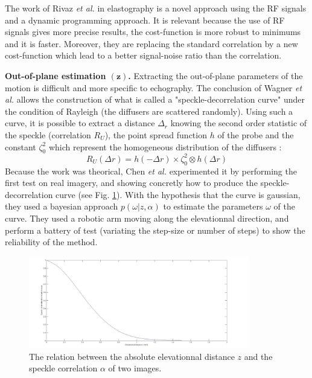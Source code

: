 \documentclass[runningheads,a4paper]{llncs}
\begin{document}
The work of Rivaz \textit{et al.} \cite{rivaz2008ultrasound} in elastography is a novel approach using the RF signals and a dynamic programming approach. It is relevant because the use of RF signals gives more precise results, the cost-function is more robust to minimums and it is faster. Moreover, they are replacing the standard correlation by a new cost-function which lead to a better signal-noise ratio than the correlation.\par
\textbf{Out-of-plane estimation $\mathbf{(z)}$.} Extracting the out-of-plane parameters of the motion is difficult and more specific to echography.
The conclusion of Wagner \textit{et al.} \cite{wagner1983statistics} allows the construction of what is called a "speckle-decorrelation curve" under the condition of Rayleigh (the diffusers are scattered randomly). Using such a curve, it is possible to extract a distance $\Delta_r$ knowing the second order statistic of the speckle (correlation $R_U$), the point spread function $h$ of the probe and the constant $\zeta_0^2$ which represent the homogeneous distribution of the diffusers :
\begin{equation}
R_U(\Delta r)=	h(-\Delta r)\times \zeta_0^2\otimes h(\Delta r)
\end{equation}
Because the work was theorical, Chen \textit{et al.} \cite{chen1997determination} experimented it by performing the first test on real imagery, and showing concretly how to produce the speckle-decorrelation curve (see Fig. \ref{fig:speckledecorrelation}).
With the hypothesis that the curve is gaussian, they used a bayesian approach $p(\omega|z,\alpha)$ to estimate the parameters $\omega$ of the curve.
They used a robotic arm moving along the elevationnal direction, and perform a battery of test (variating the step-size or number of steps) to show the reliability of the method.
\begin{figure}
\centering
\includegraphics[height=4cm]{Figures/decorrel}
\caption{The relation between the absolute elevationnal distance $z$ and the speckle correlation $\alpha$ of two images.}
\label{fig:speckledecorrelation}
\end{figure}
\end{document}
